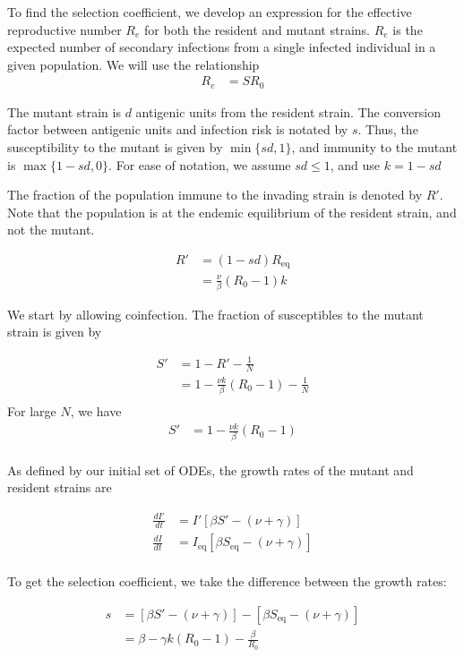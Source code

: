 \documentclass[10pt]{article}
\begin{document}
To find the selection coefficient, we develop an expression for the effective reproductive number $R_e$ for both the resident and mutant strains. 
$R_e$ is the expected number of secondary infections from a single infected individual in a given population.
We will use the relationship
\begin{align*}
R_e &= SR_0
\end{align*}

The mutant strain is $d$ antigenic units from the resident strain. 
The conversion factor between antigenic units and infection risk is notated by $s$. 
Thus, the susceptibility to the mutant is given by $\min\{sd,1\}$, and immunity to the mutant is $\max\{1-sd,0\}$. 
For ease of notation, we assume $sd \le 1$, and use $k = 1-sd$

The fraction of the population immune to the invading strain is denoted by $R'$. 
Note that the population is at the endemic equilibrium of the resident strain, and not the mutant.

\begin{align*}
R' &= (1-sd)R_\text{eq}\\
&= \frac{\nu}{\beta}(R_0-1)k
\end{align*}

We start by allowing coinfection. The fraction of susceptibles to the mutant strain is given by 

\begin{align*}
S' &= 1-R' - \frac{1}{N}\\
&= 1- \frac{\nu k }{\beta}(R_0-1) - \frac{1}{N}\\
\end{align*}
For large $N$, we have
\begin{align*}
S' &= 1- \frac{\nu k }{\beta}(R_0-1)\\
\end{align*}

As defined by our initial set of ODEs, the growth rates of the mutant and resident strains are

\begin{align*}
\frac{dI'}{dt} &= I' [\beta S' - (\nu + \gamma) ]\\
\frac{dI}{dt} &= I_\text{eq} [\beta S_\text{eq} - (\nu + \gamma) ]\\
\end{align*}

To get the selection coefficient, we take the difference between the growth rates:

\begin{align*}
s &= [\beta S' - (\nu + \gamma)] - [\beta S_\text{eq} - (\nu + \gamma) ]\\
&= \beta-\gamma k(R_0-1) - \frac{\beta}{R_0}
\end{align*}
\end{document}
